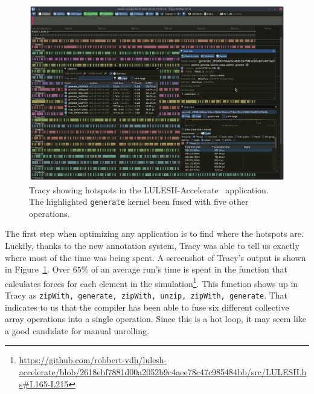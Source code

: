 \documentclass[fontsize=11pt,a4paper,parskip=half,numbers=noenddot]{scrartcl}
\newcommand{\hask}[1]{\texttt{#1}}
\begin{document}
\begin{figure}[t]
  \centering
  \def\svgwidth{\linewidth}
  \includegraphics[width=\linewidth]{assets/tracy-lulesh-hotspots.png}
  \caption{Tracy showing hotspots in the LULESH-Accelerate~\cite{lulesh-accelerate} application. The highlighted \hask{generate} kernel been fused with five other operations.}\label{fig:tracy-lulesh-hotspots}
\end{figure}

The first step when optimizing any application is to find where the hotspots
are. Luckily, thanks to the new annotation system, Tracy was able to tell us
exactly where most of the time was being spent. A screenshot of Tracy's output
is shown in Figure~\ref{fig:tracy-lulesh-hotspots}. Over $65\%$ of an average
run's time is spent in the function that calculates forces for each element in
the
simulation\footnote{\url{https://github.com/robbert-vdh/lulesh-accelerate/blob/2618ebf7881d00a2052b9c4aee78c47c985484bb/src/LULESH.hs\#L165-L215}}.
This function shows up in Tracy as \texttt{zipWith, generate, zipWith, unzip,
  zipWith, generate}. That indicates to us that the compiler has been able to
fuse six different collective array operations into a single operation. Since
this is a hot loop, it may seem like a good candidate for manual unrolling.
\end{document}
